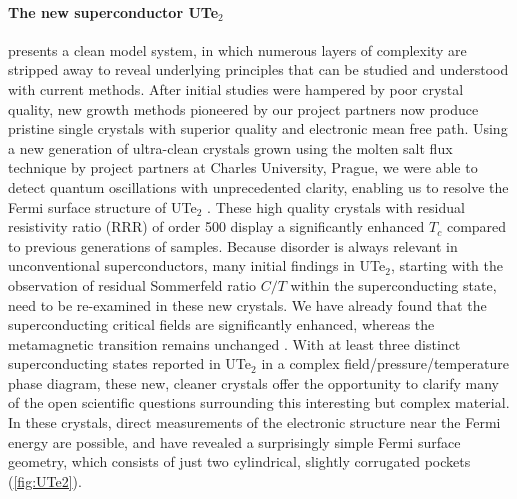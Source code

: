 \paragraph{The new superconductor UTe$_2$} presents a clean model system, in which numerous layers of complexity are stripped away to reveal underlying principles that can be studied and understood with current methods. After initial studies were hampered by poor crystal quality, new growth methods pioneered by our project partners now produce pristine single crystals with superior quality and electronic mean free path. Using a new generation of ultra-clean crystals grown using the molten salt flux technique by project partners at Charles University, Prague, we were able to detect quantum oscillations with unprecedented clarity, enabling us to resolve the Fermi surface structure of UTe$_2$ \cite{eaton23}. These high quality crystals with residual resistivity ratio (RRR) of order 500 display a significantly enhanced $T_c$ compared to previous generations of samples. Because disorder is always relevant in unconventional superconductors, many initial findings in UTe$_2$, starting with the observation of residual Sommerfeld ratio $C/T$ within the superconducting state, need to be re-examined in these new crystals. We have already found that the superconducting critical fields are significantly enhanced, whereas the metamagnetic transition remains unchanged \cite{wu23}. With at least three distinct superconducting states reported in UTe$_2$ in a complex field/pressure/temperature phase diagram, these new, cleaner crystals offer the opportunity to clarify many of the open scientific questions surrounding this interesting but complex material. In these crystals, direct measurements of the electronic structure near the Fermi energy are possible, and have revealed a surprisingly simple Fermi surface geometry, which consists of just two cylindrical, slightly corrugated pockets (\autoref{fig:UTe2}).


